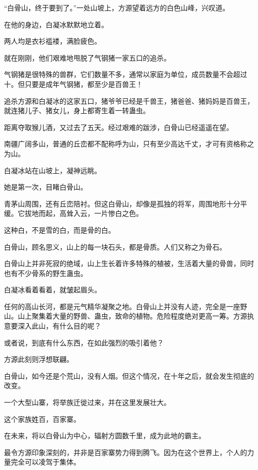 
\begin{this_body}

“白骨山，终于要到了。”一处山坡上，方源望着远方的白色山峰，兴叹道。

在他的身边，白凝冰默默地立着。

两人均是衣衫褴褛，满脸疲色。

就在刚刚，他们艰难地甩脱了气钢猪一家五口的追杀。

气钢猪是很特殊的兽群，它们数量不多，通常以家庭为单位，成员数量不会超过十。但只要是成年气钢猪，都至少是百兽王！

追杀方源和白凝冰的这家五口，猪爷爷已经是千兽王，猪爸爸、猪妈妈是百兽王，就连猪儿子、猪女儿，身上都寄生着一转蛊虫。

距离夺取猴儿酒，又过去了五天。经过艰难的跋涉，白骨山已经遥遥在望。

南疆广阔多山，普通的丘峦都不配称呼为山，只有至少高达千丈，才可有资格称之为山。

白凝冰站在山坡上，凝神远眺。

她是第一次，目睹白骨山。

青茅山周围，还有丘峦陪衬。但这白骨山，却像是孤独的将军，周围地形十分平缓。它拔地而起，高耸入云，一片惨白之色。

这种白，不是雪的白，而是骨的白。

白骨山，顾名思义，山上的每一块石头，都是骨质。人们又称之为骨石。

白骨山上并非死寂的绝域，山上生长着许多特殊的植被，生活着大量的骨兽，同时也有不少骨系的野生蛊虫。

白凝冰看着看着，就皱起眉头。

任何的高山长河，都是元气精华凝聚之地。白骨山上并没有人迹，完全是一座野山。山上聚集着大量的野兽、蛊虫，致命的植物。危险程度绝对更高一筹。方源执意要深入此山，有什么目的呢？

或者说，到底有什么东西，在如此强烈的吸引着他？

方源此刻则浮想联翩。

白骨山，如今还是个荒山，没有人烟。但这个情况，在十年之后，就会发生彻底的改变。

一个大型山寨，将举族迁徙过来，并在这里发展壮大。

这个家族姓百，百家寨。

在未来，将以白骨山为中心，辐射方圆数千里，成为此地的霸主。

最令方源印象深刻的，并非是百家寨势力得到腾飞。因为在这个世界上，个人的力量完全可以凌驾于集体。


\end{this_body}
